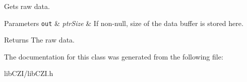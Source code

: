 Gets raw data. 
\begin{DoxyParams}[1]{Parameters}
\mbox{\tt out}  & {\em ptr\+Size} & If non-\/null, size of the data buffer is stored here. \\
\hline
\end{DoxyParams}
\begin{DoxyReturn}{Returns}
The raw data. 
\end{DoxyReturn}


The documentation for this class was generated from the following file\+:\begin{DoxyCompactItemize}
\item 
lib\+C\+Z\+I/lib\+C\+Z\+I.\+h\end{DoxyCompactItemize}

